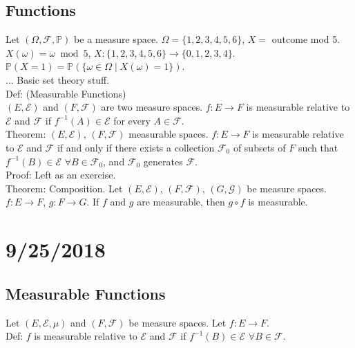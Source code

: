 \documentclass[english, 11pt]{article}
\begin{document}
\subsection{Functions}

Let $(\Omega, \mathcal{F}, \mathbb{P})$ be a measure space. $\Omega = \{1, 2, 3, 4, 5, 6\}$, $X =$ outcome mod 5. $X(\omega) = \omega \bmod 5$, $X: \{1, 2, 3, 4, 5, 6\} \to \{0, 1, 2, 3, 4\}$. $\mathbb{P}(X = 1) = \mathbb{P}(\{\omega \in \Omega \mid X(\omega) = 1\})$.\\

... Basic set theory stuff.\\

Def: (Measurable Functions)\\
$(E, \mathcal{E})$ and $(F, \mathcal{F})$ are two measure spaces. $f: E \to F$ is measurable relative to $\mathcal{E}$ and $\mathcal{F}$ if $f^{-1}(A) \in \mathcal{E}$ for every $A \in \mathcal{F}$.\\

Theorem: $(E, \mathcal{E})$, $(F, \mathcal{F})$ measurable spaces. $f: E \to F$ is measurable relative to $\mathcal{E}$ and $\mathcal{F}$ if and only if there exists a collection $\mathcal{F}_0$ of subsets of $F$ such that $f^{-1}(B) \in \mathcal{E}$ $\forall B \in \mathcal{F_0}$, and $\mathcal{F}_0$ generates $\mathcal{F}$.\\

Proof: Left as an exercise.\\

Theorem: Composition. Let $(E, \mathcal{E})$, $(F, \mathcal{F})$, $(G, \mathcal{G})$ be measure spaces. $f: E \to F$, $g: F \to G$. If $f$ and $g$ are measurable, then $g \circ f$ is measurable.

\section{9/25/2018}

\subsection{Measurable Functions}

Let $(E, \mathcal{E}, \mu)$ and $(F, \mathcal{F})$ be measure spaces. Let $f: E \to F$.\\

Def: $f$ is measurable relative to $\mathcal{E}$ and $\mathcal{F}$ if $f^{-1}(B) \in \mathcal{E}$ $\forall B \in \mathcal{F}$.\\
\end{document}

